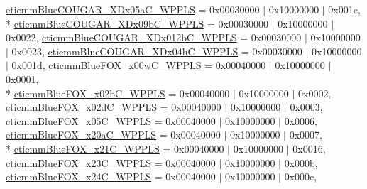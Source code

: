 \begin{DoxyCompactItemize}
\hyperlink{group___common_interface_gga514bdc683ef27995fdeba04aec25f571ad0d8310a42b5ee0fb793a5089a6885be}{cticmm\+Blue\+C\+O\+U\+G\+A\+R\+\_\+\+X\+Dx05a\+C\+\_\+\+W\+P\+P\+L\+S} = 0x00030000 $\vert$ 0x10000000 $\vert$ 0x001c, 
\\*
\hyperlink{group___common_interface_gga514bdc683ef27995fdeba04aec25f571a08c9143be091a2d118e628555184cd24}{cticmm\+Blue\+C\+O\+U\+G\+A\+R\+\_\+\+X\+Dx09b\+C\+\_\+\+W\+P\+P\+L\+S} = 0x00030000 $\vert$ 0x10000000 $\vert$ 0x0022, 
\hyperlink{group___common_interface_gga514bdc683ef27995fdeba04aec25f571afc492289885a7ce6f401cff7b1a09018}{cticmm\+Blue\+C\+O\+U\+G\+A\+R\+\_\+\+X\+Dx012b\+C\+\_\+\+W\+P\+P\+L\+S} = 0x00030000 $\vert$ 0x10000000 $\vert$ 0x0023, 
\hyperlink{group___common_interface_gga514bdc683ef27995fdeba04aec25f571aabafdcaca6cb3f4278e58cc6cc44577b}{cticmm\+Blue\+C\+O\+U\+G\+A\+R\+\_\+\+X\+Dx04h\+C\+\_\+\+W\+P\+P\+L\+S} = 0x00030000 $\vert$ 0x10000000 $\vert$ 0x001d, 
\hyperlink{group___common_interface_gga514bdc683ef27995fdeba04aec25f571a44878f80518c0a12742d91c1a2fe0df6}{cticmm\+Blue\+F\+O\+X\+\_\+x00w\+C\+\_\+\+W\+P\+P\+L\+S} = 0x00040000 $\vert$ 0x10000000 $\vert$ 0x0001, 
\\*
\hyperlink{group___common_interface_gga514bdc683ef27995fdeba04aec25f571a19f5632cbf653174026c75d38c677824}{cticmm\+Blue\+F\+O\+X\+\_\+x02b\+C\+\_\+\+W\+P\+P\+L\+S} = 0x00040000 $\vert$ 0x10000000 $\vert$ 0x0002, 
\hyperlink{group___common_interface_gga514bdc683ef27995fdeba04aec25f571a581e0473a144425a80f58d04d2584aca}{cticmm\+Blue\+F\+O\+X\+\_\+x02d\+C\+\_\+\+W\+P\+P\+L\+S} = 0x00040000 $\vert$ 0x10000000 $\vert$ 0x0003, 
\hyperlink{group___common_interface_gga514bdc683ef27995fdeba04aec25f571ad5cda2170247bbdb2bc8ac1ce59d28e8}{cticmm\+Blue\+F\+O\+X\+\_\+x05\+C\+\_\+\+W\+P\+P\+L\+S} = 0x00040000 $\vert$ 0x10000000 $\vert$ 0x0006, 
\hyperlink{group___common_interface_gga514bdc683ef27995fdeba04aec25f571a878ed9013b6afc6a951d930514ebc829}{cticmm\+Blue\+F\+O\+X\+\_\+x20a\+C\+\_\+\+W\+P\+P\+L\+S} = 0x00040000 $\vert$ 0x10000000 $\vert$ 0x0007, 
\\*
\hyperlink{group___common_interface_gga514bdc683ef27995fdeba04aec25f571afbd7997ec1556d5bc4446ce73e9aede0}{cticmm\+Blue\+F\+O\+X\+\_\+x21\+C\+\_\+\+W\+P\+P\+L\+S} = 0x00040000 $\vert$ 0x10000000 $\vert$ 0x0016, 
\hyperlink{group___common_interface_gga514bdc683ef27995fdeba04aec25f571ac9cb9a3b470672b1b81df8dcc2dc63ea}{cticmm\+Blue\+F\+O\+X\+\_\+x23\+C\+\_\+\+W\+P\+P\+L\+S} = 0x00040000 $\vert$ 0x10000000 $\vert$ 0x000b, 
\hyperlink{group___common_interface_gga514bdc683ef27995fdeba04aec25f571a964e4a524aa6803a6f299231262da6f6}{cticmm\+Blue\+F\+O\+X\+\_\+x24\+C\+\_\+\+W\+P\+P\+L\+S} = 0x00040000 $\vert$ 0x10000000 $\vert$ 0x000c, 

\end{DoxyCompactItemize}
